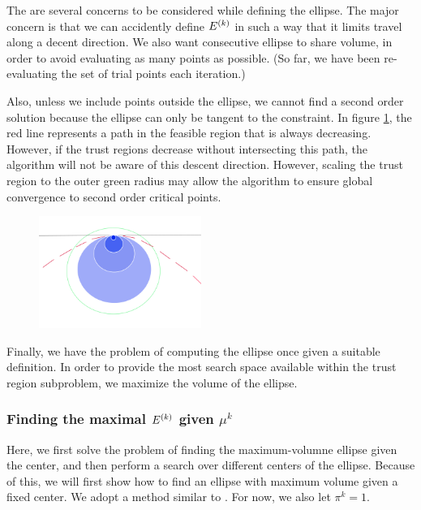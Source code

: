 The are several concerns to be considered while defining the ellipse.
The major concern is that we can accidently define ${E^{(k)}}$ in such a way that it limits travel along a decent direction.
We also want consecutive ellipse to share volume, in order to avoid evaluating as many points as possible.
(So far, we have been re-evaluating the set of trial points each iteration.)


Also, unless we include points outside the ellipse, we cannot find a second order solution because the ellipse can only be tangent to the constraint.
In figure \ref{fbns}, the red line represents a path in the feasible region that is always decreasing.
However, if the trust regions decrease without intersecting this path, the algorithm will not be aware of this descent direction.
However, scaling the trust region to the outer green radius may allow the algorithm to ensure global convergence to second order critical points.

\begin{figure}[h]
    \centering
    \includegraphics[width=200px]{images/second_order_critical_point.png}
    \label{fbns}
\end{figure}



Finally, we have the problem of computing the ellipse once given a suitable definition.
In order to provide the most search space available within the trust region subproblem, we maximize the volume of the ellipse.

\subsubsection{Finding the maximal $ {E^{(k)}} $ given $\mu^k$}

\label{ellipse_optimization}

Here, we first solve the problem of finding the maximum-volumne ellipse given the center, and then perform a search over different centers of the ellipse.
Because of this, we will first show how to find an ellipse with maximum volume given a fixed center.
We adopt a method similar to \cite{Khachiyan1993}.
For now, we also let $\pi^k = 1$.

